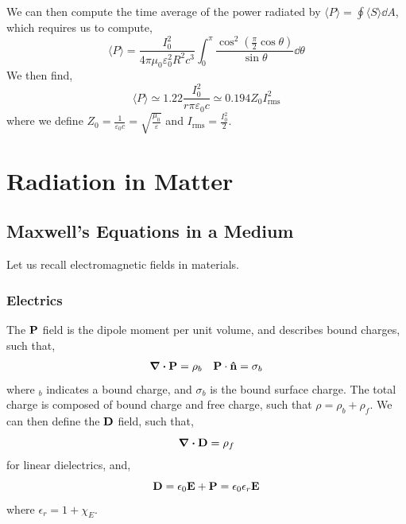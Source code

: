 \documentclass{book}
\begin{document}
We can then compute the time average of the power radiated by $\langle P \rangle = \oint \langle S \rangle\dd{A}$, which requires us to compute,
\begin{equation}
	\langle P \rangle = \frac{I_0^2}{4\pi \mu_0\varepsilon_0^2 R^2c^3}\int_0^{\pi}\frac{\cos^2\left(\frac{\pi}{2}\cos\theta\right)}{\sin\theta}\dd{\theta}
\end{equation}
We then find,
\begin{equation}
	\langle P \rangle \simeq 1.22\frac{I_0^2}{r\pi \varepsilon_0 c} \simeq 0.194Z_0I_{\text{rms}}^2
\end{equation}
where we define $Z_0 = \frac{1}{\varepsilon_0 c} = \sqrt{\frac{\mu_0}{\varepsilon}}$ and $I_{\text{rms}} = \frac{I_0^2}{2}$.

\chapter{Radiation in Matter}
\section{Maxwell's Equations in a Medium}
Let us recall electromagnetic fields in materials. 
\subsection{Electrics}
The $\vb{P}$ field is the dipole moment per unit volume, and describes bound charges, such that,
\begin{align}
	\div{\vb{P}} = \rho_b && \vb{P}\cdot\vu{n} = \sigma_b
\end{align}
where $_b$ indicates a bound charge, and $\sigma_b$ is the bound surface charge. The total charge is composed of bound charge and free charge, such that $\rho = \rho_b + \rho_f$. We can then define the $\vb{D}$ field, such that,
\begin{equation}
	\div{\vb{D}} = \rho_f
\end{equation} 
for linear dielectrics, and,
\begin{equation}
	\vb{D} = \epsilon_0\vb{E} + \vb{P} = \epsilon_0\epsilon_r\vb{E}
\end{equation}
where $\epsilon_r = 1 + \chi_E$.
\end{document}
